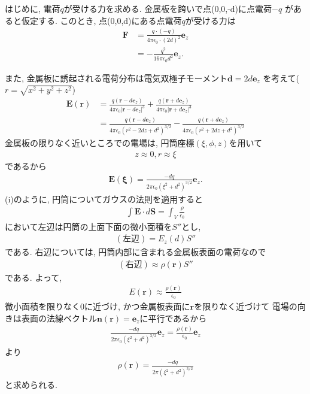 \documentclass[a4paper,12pt]{jlreq}
\begin{document}
はじめに, 電荷$q$が受ける力を求める. 金属板を跨いで点(0,0,-d)に点電荷$-q$
があると仮定する. このとき, 点(0,0,d)にある点電荷$q$が受ける力は
\begin{align}
  \bm{F} &= \frac{q \cdot (-q)}{4\pi \epsilon_0 \cdot (2d)^2} \bm{e}_z\\
  &= -\frac{q^2}{16\pi \epsilon_0 d^2} \bm{e}_z.
\end{align}

また, 金属板に誘起される電荷分布は電気双極子モーメント$\bm{d} = 2d\bm{e}_z$
を考えて($r = \sqrt{x^2+y^2+z^2}$)
\begin{align}
  \bm{E}(\bm{r}) &= \frac{q(\bm{r} - d\bm{e}_z)}{4\pi \epsilon_0 |\bm{r} - d\bm{e}_z|^3} + \frac{q(\bm{r} + d\bm{e}_z)}{4\pi \epsilon_0 |\bm{r} + d\bm{e}_z|^3}\\
  &= \frac{q(\bm{r} - d\bm{e}_z)}{4\pi \epsilon_0 (r^2 - 2dz + d^2)^{3/2}} - \frac{q(\bm{r} + d\bm{e}_z)}{4\pi \epsilon_0 (r^2 + 2dz + d^2)^{3/2}}
\end{align}
金属板の限りなく近いところでの電場は, 円筒座標$(\xi,\phi,z)$を用いて
\begin{align}
  z \approx 0,　r \approx \xi
\end{align}
であるから
\begin{align}
  \bm{E}(\bm{\xi}) = \frac{-dq}{2\pi \epsilon_0 (\xi^2 + d^2)^{3/2}}\bm{e}_z.
\end{align}
(i)のように, 円筒についてガウスの法則を適用すると
\begin{align}
  \int \bm{E} \cdot d\bm{S} = \int_{V}^{} \frac{\rho}{\epsilon_0}
\end{align}
において左辺は円筒の上面下面の微小面積を$S''$とし, 
\begin{align}
  (左辺) = E_z(d)S''
\end{align}
である. 右辺については, 円筒内部に含まれる金属板表面の電荷なので
\begin{align}
  (右辺) \approx \rho(\bm{r})S''
\end{align}
である. よって, 
\begin{align}
  E(\bm{r}) \approx \frac{\rho(\bm{r})}{\epsilon_0}
\end{align}
微小面積を限りなく0に近づけ, かつ金属板表面に$\bm{r}$を限りなく近づけて
電場の向きは表面の法線ベクトル$\bm{n}(\bm{r}) = \bm{e}_z$に平行であるから
\begin{align}
  \frac{-dq}{2\pi \epsilon_0 (\xi^2 + d^2)^{3/2}}\bm{e}_z = \frac{\rho(\bm{r})}{\epsilon_0}\bm{e}_z
\end{align}
より
\begin{align}
  \rho (\bm{r}) = \frac{-dq}{2\pi (\xi^2 + d^2)^{3/2}}
\end{align}
と求められる. 
\end{document}

